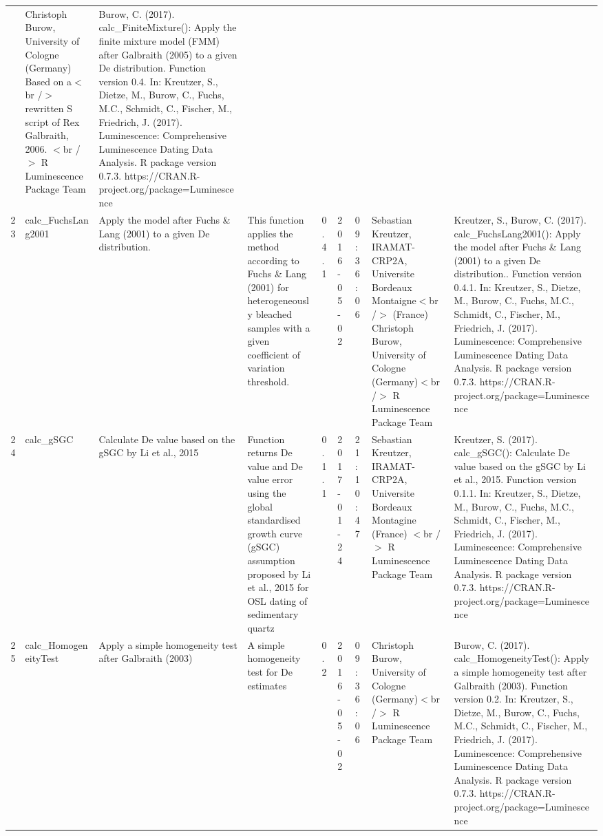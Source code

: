 \begin{table}[ht]
\begin{tabular}{rllllllll}
 & Christoph Burow, University of Cologne (Germany)   Based on a$<$br /$>$ rewritten S script of Rex Galbraith, 2006.  $<$br /$>$  R Luminescence Package Team & Burow, C. (2017). calc\_FiniteMixture(): Apply the finite mixture model (FMM) after Galbraith (2005) to a given De distribution. Function version 0.4. In: Kreutzer, S., Dietze, M., Burow, C., Fuchs, M.C., Schmidt, C., Fischer, M., Friedrich, J. (2017). Luminescence: Comprehensive Luminescence Dating Data Analysis. R package version 0.7.3. https://CRAN.R-project.org/package=Luminescence
 \\ 
  23 & calc\_FuchsLang2001 & Apply the model after Fuchs \& Lang (2001) to a given De distribution. & This function applies the method according to Fuchs \& Lang (2001) for heterogeneously bleached samples with a given coefficient of variation threshold. & 0.4.1 & 2016-05-02 & 09:36:06
 & Sebastian Kreutzer, IRAMAT-CRP2A, Universite Bordeaux Montaigne$<$br /$>$ (France) Christoph Burow, University of Cologne (Germany)$<$br /$>$  R Luminescence Package Team & Kreutzer, S., Burow, C. (2017). calc\_FuchsLang2001(): Apply the model after Fuchs \& Lang (2001) to a given De distribution.. Function version 0.4.1. In: Kreutzer, S., Dietze, M., Burow, C., Fuchs, M.C., Schmidt, C., Fischer, M., Friedrich, J. (2017). Luminescence: Comprehensive Luminescence Dating Data Analysis. R package version 0.7.3. https://CRAN.R-project.org/package=Luminescence
 \\ 
  24 & calc\_gSGC & Calculate De value based on the gSGC by Li et al., 2015 & Function returns De value and De value error using the global standardised growth curve (gSGC) assumption proposed by Li et al., 2015 for OSL dating of sedimentary quartz & 0.1.1 & 2017-01-24 & 21:10:47
 & Sebastian Kreutzer, IRAMAT-CRP2A, Universite Bordeaux Montagine (France) $<$br /$>$  R Luminescence Package Team & Kreutzer, S. (2017). calc\_gSGC(): Calculate De value based on the gSGC by Li et al., 2015. Function version 0.1.1. In: Kreutzer, S., Dietze, M., Burow, C., Fuchs, M.C., Schmidt, C., Fischer, M., Friedrich, J. (2017). Luminescence: Comprehensive Luminescence Dating Data Analysis. R package version 0.7.3. https://CRAN.R-project.org/package=Luminescence
 \\ 
  25 & calc\_HomogeneityTest & Apply a simple homogeneity test after Galbraith (2003) & A simple homogeneity test for De estimates & 0.2 & 2016-05-02 & 09:36:06
 & Christoph Burow, University of Cologne (Germany)$<$br /$>$  R Luminescence Package Team & Burow, C. (2017). calc\_HomogeneityTest(): Apply a simple homogeneity test after Galbraith (2003). Function version 0.2. In: Kreutzer, S., Dietze, M., Burow, C., Fuchs, M.C., Schmidt, C., Fischer, M., Friedrich, J. (2017). Luminescence: Comprehensive Luminescence Dating Data Analysis. R package version 0.7.3. https://CRAN.R-project.org/package=Luminescence

\end{tabular}
\end{table}
